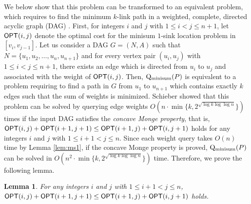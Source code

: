 \documentclass[a4paper]{llncs}
\newtheorem{lem}{Lemma}
\begin{document}
We below show that this problem can be transformed to an equivalent problem, which requires to find the minimum $k$-link path in a weighted, complete, directed acyclic graph (DAG) \cite{s98}.
First, for integers $i$ and $j$ with $1 \le i < j \le n+1$, let ${\sf OPT}(i, j)$ denote the optimal cost for the minisum $1$-sink location problem in $[v_i, v_{j-1}]$.
Let us consider a DAG $G = (N, A)$ such that $N = \{ u_1, u_2, \ldots, u_n, u_{n+1} \}$ and
for every vertex pair $(u_i, u_j)$ with $1 \le i < j \le n+1$, 
there exists an edge which is directed from $u_i$ to $u_j$ and associated with the weight of ${\sf OPT}(i, j)$.
Then, ${\rm Q_{minisum}}(P)$ is equivalent to a problem requiring to find a path in $G$ from $u_1$ to $u_{n+1}$ which contains exactly $k$ edges such that the sum of weights is minimized.
Schieber \cite{s98} showed that this problem can be solved by querying edge weights $O(n \cdot \min \{ k, 2^{\sqrt{\log k \log \log n}}\})$ times
if the input DAG satisfies the {\it concave Monge property}, that is, ${\sf OPT}(i, j) + {\sf OPT}(i+1, j+1) \le {\sf OPT}(i+1, j) + {\sf OPT}(i, j+1)$ holds for any integers $i$ and $j$ with $1 \le i+1 < j \le n$.
Since each weight query takes $O(n)$ time by Lemma \ref{lem:ms1}, if the concave Monge property is proved, ${\rm Q_{minisum}}(P)$ can be solved in $O(n^2 \cdot \min \{ k, 2^{\sqrt{\log k \log \log n}}\})$ time.
Therefore, we prove the following lemma.
\begin{lem}
For any integers $i$ and $j$ with $1 \le i+1 < j \le n$,
${\sf OPT}(i, j) + {\sf OPT}(i+1, j+1) \le {\sf OPT}(i+1, j) + {\sf OPT}(i, j+1)$ holds.
\label{lem:ms2}
\end{lem}
\end{document}
